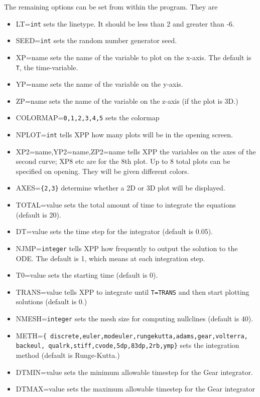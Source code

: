 The remaining options can be set from within the program. They are 

\begin{itemize}\itemsep -.05in
\item LT={\tt int} sets the linetype. It should be less than 2 and
greater than -6. 
\item SEED={\tt int} sets the random number generator seed. 
 \item XP=name sets the name of the variable to plot on the x-axis.
The default is {\tt T}, the time-variable.
\item YP=name sets the name of the variable on the y-axis.
\item ZP=name sets the name of the variable on the z-axis (if the plot
is 3D.) 
\item COLORMAP={\tt 0,1,2,3,4,5} sets the colormap
\item NPLOT={\tt int} tells XPP how many plots will be in the opening
screen. 
\item XP2=name,YP2=name,ZP2=name tells XPP the variables on the axes
of the second curve; XP8 etc are for the 8th plot. Up to 8 total plots
can be specified on opening. They will be given different colors.  
\item AXES={\tt \{2,3\}} determine whether a 2D or 3D plot will be
displayed.
\item TOTAL=value sets the total amount of time to integrate the
equations (default is 20).
\item DT=value sets the time step for the integrator (default is 0.05).
\item NJMP={\tt integer} tells XPP how frequently to output the
solution to the ODE.  The default is 1, which means at each
integration step.
\item T0=value sets the starting time (default is 0). 
\item TRANS=value tells XPP to integrate until {\tt T=TRANS} and then
start plotting solutions (default is 0.)
\item NMESH={\tt integer} sets the mesh size for computing nullclines
(default is 40).
\item METH={\tt \{
discrete,euler,modeuler,rungekutta,adams,gear,volterra, backeul,
qualrk,stiff,cvode,5dp,83dp,2rb,ymp\}}
sets the integration method (default is Runge-Kutta.)
\item DTMIN=value sets the minimum allowable timestep for the Gear
integrator.
\item DTMAX=value sets the maximum allowable timestep for the Gear
integrator

\end{itemize}
